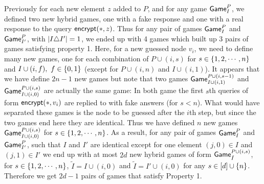 \documentclass{article}
\newcommand{\encrypt}{{\sf encrypt}}
\newcommand{\game}{{\sf Game}}
\newcommand{\T}{{\mathsf T}}
\newcommand{\dgg}[2]{\game_{#1}^{#2}}
\newcommand{\gpi}{$\game^P_I$}
\begin{document}
Previously for each new element $z$ added to $P$, and for any game \gpi, we defined two new hybrid games, one with a fake response and one with a real response to the query $\encrypt(*,z)$. Thus for any pair of games $\dgg{I}{P}$ and $\dgg{I'}{P}$, with $\left| I \triangle I' \right|=1$, we ended up with 4 games which built up 3 pairs of games satisfying property 1. Here, for a new guessed node $v_i$, we need to define many new games, one for each combination of $P\cup (i,s)$ for $s\in\left\{ 1,2,\cdots,n \right\}$ and $I\cup(i,f), \ f\in\{0,1\}$ (except for $P\cup (i,n)$ and $I \cup (i,1)$). It appears that we have define $2n-1$ new games but note that two games $\dgg {I\cup (i,1)}{P\cup(i,s-1)}$ and $\dgg {I\cup (i,0)}{P\cup(i,s)}$ are actually the same game: In both game the first $s$th queries of form $\encrypt(*,v_i)$ are replied to with fake answers (for $s<n$). What would have separated these games is the node to be guessed after the $i$th step, but since the two games end here they are identical. Thus we have defined $n$ new games $\dgg {I\cup (i,0)}{P\cup(i,s)}$ for $s\in \left\{ 1,2,\cdots,n \right\}$. %
As a result, for any pair of games $\dgg{I}{P}$ and $\dgg{I'}{P}$, such that $I$ and $I'$ are identical except for one element $(j,0)\in I$ and $(j,1)\in I'$ we end up with at most $2d$ new hybrid games of form $\dgg{\tilde{I}}{P\cup (i,s)}$, for $s\in \left\{ 1,2,\cdots, n \right\}$, $\tilde{I}=I\cup (i,0)$ and $\tilde{I}=I'\cup (i,0)$ for any $s\in [d]\cup \left\{ n \right\}$. Therefore we get $2d-1$ pairs of games that satisfy Property 1. 
\end{document}
